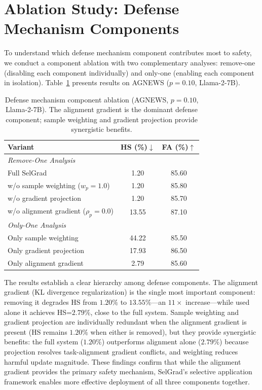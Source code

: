 \section{Ablation Study: Defense Mechanism Components}
\label{sec:ablation_components}

To understand which defense mechanism component contributes most to safety, we conduct a component ablation with two complementary analyses: remove-one (disabling each component individually) and only-one (enabling each component in isolation). Table~\ref{tab:ablation_components} presents results on AGNEWS ($p=0.10$, Llama-2-7B).

\begin{table}[htbp]
\centering
\caption{Defense mechanism component ablation (AGNEWS, $p=0.10$, Llama-2-7B). The alignment gradient is the dominant defense component; sample weighting and gradient projection provide synergistic benefits.}
\label{tab:ablation_components}
\renewcommand{\arraystretch}{1.2}
\begin{tabular}{lcc}
\toprule
\textbf{Variant} & \textbf{HS (\%)$\downarrow$} & \textbf{FA (\%)$\uparrow$} \\
\midrule
\multicolumn{3}{l}{\textit{Remove-One Analysis}} \\
Full SelGrad & \cellcolor{bestcolor}1.20 & 85.60 \\
w/o sample weighting ($w_p=1.0$) & 1.20 & 85.80 \\
w/o gradient projection & 1.20 & 85.70 \\
w/o alignment gradient ($\rho_p=0.0$) & 13.55 & 87.10 \\
\midrule
\multicolumn{3}{l}{\textit{Only-One Analysis}} \\
Only sample weighting & 44.22 & 85.50 \\
Only gradient projection & 17.93 & 86.50 \\
Only alignment gradient & 2.79 & 85.60 \\
\bottomrule
\end{tabular}
\end{table}

The results establish a clear hierarchy among defense components. The alignment gradient (KL divergence regularization) is the single most important component: removing it degrades HS from $1.20\%$ to $13.55\%$---an $11\times$ increase---while used alone it achieves HS=$2.79\%$, close to the full system. Sample weighting and gradient projection are individually redundant when the alignment gradient is present (HS remains $1.20\%$ when either is removed), but they provide synergistic benefits: the full system ($1.20\%$) outperforms alignment alone ($2.79\%$) because projection resolves task-alignment gradient conflicts, and weighting reduces harmful update magnitude. These findings confirm that while the alignment gradient provides the primary safety mechanism, SelGrad's selective application framework enables more effective deployment of all three components together.

